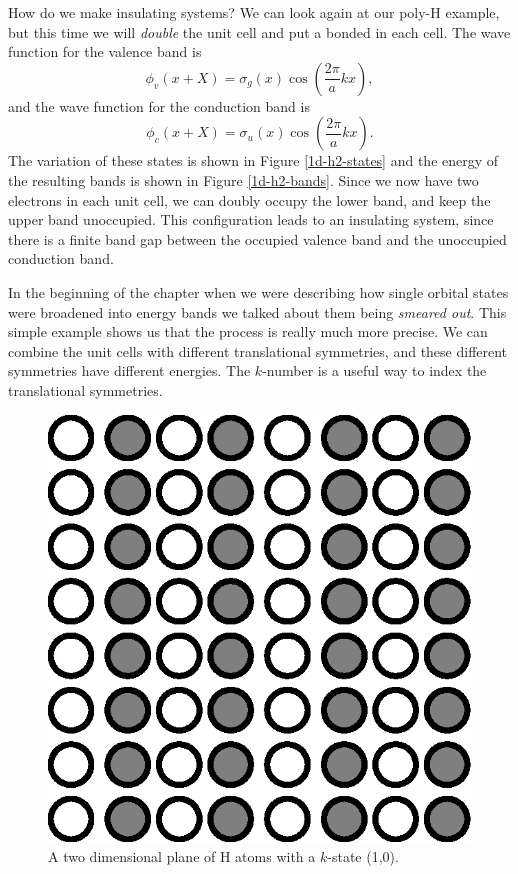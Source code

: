 How do we make insulating systems? We can look again at our poly-H
example, but this time we will \emph{double} the unit cell and put a
bonded  in each cell. The wave function for the valence band
is
\begin{equation}
 \phi_v(x+X) = \sigma_g(x)\cos\left(\frac{2\pi}{a}kx\right),
\label{h2g-bloch}
\end{equation}
and the wave function for the conduction band is
\begin{equation}
 \phi_c(x+X) = \sigma_u(x)\cos\left(\frac{2\pi}{a}kx\right).
\label{h2u-bloch}
\end{equation}
The variation of these states is
shown in Figure \ref{1d-h2-states} and the energy of the resulting
bands is shown in Figure \ref{1d-h2-bands}. Since we now have two
electrons in each unit cell, we can doubly occupy the lower band, and
keep the upper band unoccupied. This configuration leads to an
insulating system, since there is a finite band gap between the
occupied valence band and the unoccupied conduction band.

In the beginning of the chapter when we were describing how single
orbital states were broadened into energy bands we talked about them
being \emph{smeared out}. This simple example shows us that the
process is really much more precise. We can combine the unit cells
with  different translational symmetries, and these different
symmetries have different energies. The $k$-number is a useful way to
index the translational symmetries.

\begin{figure}
\begin{center}
\includegraphics[scale=0.5]{2d-states.eps}
\caption{A two dimensional plane of H atoms with a $k$-state (1,0).}
\label{2d-states}
\end{center}
\end{figure}

